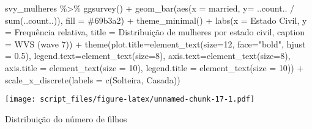 \documentclass[
]{article}
\newenvironment{Shaded}{\begin{snugshade}}{\end{snugshade}}
\newcommand{\AttributeTok}[1]{\textcolor[rgb]{0.77,0.63,0.00}{#1}}
\newcommand{\DecValTok}[1]{\textcolor[rgb]{0.00,0.00,0.81}{#1}}
\newcommand{\FloatTok}[1]{\textcolor[rgb]{0.00,0.00,0.81}{#1}}
\newcommand{\FunctionTok}[1]{\textcolor[rgb]{0.00,0.00,0.00}{#1}}
\newcommand{\NormalTok}[1]{#1}
\newcommand{\SpecialCharTok}[1]{\textcolor[rgb]{0.00,0.00,0.00}{#1}}
\newcommand{\StringTok}[1]{\textcolor[rgb]{0.31,0.60,0.02}{#1}}
\begin{document}
\begin{Shaded}
\begin{Highlighting}[]
\NormalTok{svy\_mulheres }\SpecialCharTok{\%\textgreater{}\%}
  \FunctionTok{ggsurvey}\NormalTok{() }\SpecialCharTok{+}
  \FunctionTok{geom\_bar}\NormalTok{(}\FunctionTok{aes}\NormalTok{(}\AttributeTok{x =}\NormalTok{ married, }\AttributeTok{y=}\NormalTok{ ..count.. }\SpecialCharTok{/} \FunctionTok{sum}\NormalTok{(..count..)), }\AttributeTok{fill =} \StringTok{\textquotesingle{}\#69b3a2\textquotesingle{}}\NormalTok{) }\SpecialCharTok{+}
  \FunctionTok{theme\_minimal}\NormalTok{() }\SpecialCharTok{+}
  \FunctionTok{labs}\NormalTok{(}\AttributeTok{x =} \StringTok{\textquotesingle{}Estado Civil\textquotesingle{}}\NormalTok{,}
       \AttributeTok{y =} \StringTok{\textquotesingle{}Frequência relativa\textquotesingle{}}\NormalTok{,}
       \AttributeTok{title =} \StringTok{\textquotesingle{}Distribuição de mulheres por estado civil\textquotesingle{}}\NormalTok{,}
       \AttributeTok{caption =} \StringTok{\textquotesingle{}WVS (wave 7)\textquotesingle{}}\NormalTok{) }\SpecialCharTok{+}
  \FunctionTok{theme}\NormalTok{(}\AttributeTok{plot.title=}\FunctionTok{element\_text}\NormalTok{(}\AttributeTok{size=}\DecValTok{12}\NormalTok{, }\AttributeTok{face=}\StringTok{"bold"}\NormalTok{, }\AttributeTok{hjust =} \FloatTok{0.5}\NormalTok{),}
        \AttributeTok{legend.text=}\FunctionTok{element\_text}\NormalTok{(}\AttributeTok{size=}\DecValTok{8}\NormalTok{),}
        \AttributeTok{axis.text=}\FunctionTok{element\_text}\NormalTok{(}\AttributeTok{size=}\DecValTok{8}\NormalTok{),}
        \AttributeTok{axis.title =} \FunctionTok{element\_text}\NormalTok{(}\AttributeTok{size =} \DecValTok{10}\NormalTok{),}
        \AttributeTok{legend.title =} \FunctionTok{element\_text}\NormalTok{(}\AttributeTok{size =} \DecValTok{10}\NormalTok{)) }\SpecialCharTok{+}
    \FunctionTok{scale\_x\_discrete}\NormalTok{(}\AttributeTok{labels =} \FunctionTok{c}\NormalTok{(}\StringTok{\textquotesingle{}Solteira\textquotesingle{}}\NormalTok{, }\StringTok{\textquotesingle{}Casada\textquotesingle{}}\NormalTok{))}
\end{Highlighting}
\end{Shaded}

\texttt{[image: script\_files/figure-latex/unnamed-chunk-17-1.pdf]}

Distribuição do número de filhos
\end{document}
